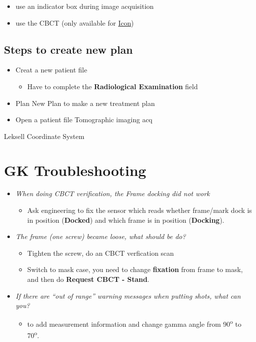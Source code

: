\documentclass[]{book}
\providecommand{\tightlist}{%
  \setlength{\itemsep}{0pt}\setlength{\parskip}{0pt}}
\theoremstyle{definition}
\theoremstyle{definition}
\theoremstyle{definition}
\theoremstyle{remark}
\begin{document}
\begin{itemize}
\tightlist
\item
  use an indicator box during image acquisition
\item
  use the CBCT (only available for
  \href{https://www.youtube.com/watch?v=ZeFFwkxnoME}{Icon})
\end{itemize}

\subsection{Steps to create new plan}\label{steps-to-create-new-plan}

\begin{itemize}
\tightlist
\item
  Creat a new patient file

  \begin{itemize}
  \tightlist
  \item
    Have to complete the \textbf{Radiological Examination} field
  \end{itemize}
\item
  Plan \textbar{} New Plan to make a new treatment plan
\item
  Open a patient file Tomographic imaging acq
\end{itemize}

Leksell Coordinate System

\section{GK Troubleshooting}\label{gk-troubleshooting}

\begin{itemize}
\tightlist
\item
  \emph{When doing CBCT verification, the Frame docking did not work}

  \begin{itemize}
  \tightlist
  \item
    Ask engineering to fix the sensor which reads whether frame/mark
    dock is in position (\textbf{Docked}) and which frame is in position
    (\textbf{Docking}).
  \end{itemize}
\item
  \emph{The frame (one screw) became loose, what should be do?}

  \begin{itemize}
  \tightlist
  \item
    Tighten the screw, do an CBCT verfication scan
  \item
    Switch to mask case, you need to change \textbf{fixation} from frame
    to mask, and then do \textbf{Request CBCT - Stand}.
  \end{itemize}
\item
  \emph{If there are ``out of range'' warning messages when putting
  shots, what can you?}

  \begin{itemize}
  \tightlist
  \item
    to add measurement information and change gamma angle from
    90\textsuperscript{o} to 70\textsuperscript{o}.
  \end{itemize}
\end{itemize}
\end{document}
